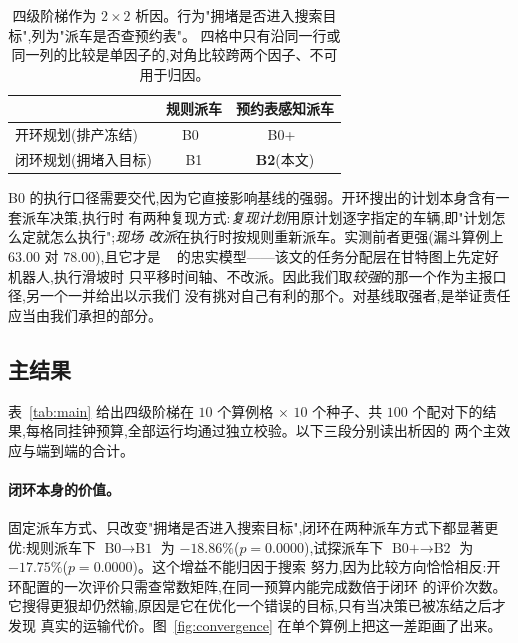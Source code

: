 \documentclass[manuscript,screen,review]{acmart}
\newcommand{\NCases}{10}
\newcommand{\NSeeds}{10}
\newcommand{\NPairs}{100}
\newcommand{\GainLoopRule}{18.86\%}      %
\newcommand{\PLoopRule}{0.0000}
\newcommand{\GainLoopProbe}{17.75\%}     %
\newcommand{\PLoopProbe}{0.0000}
\begin{document}
\begin{table}[t]
\caption{四级阶梯作为 $2\times 2$ 析因。行为"拥堵是否进入搜索目标",列为"派车是否查预约表"。
四格中只有沿同一行或同一列的比较是单因子的,对角比较跨两个因子、不可用于归因。}
\label{tab:arms}
\footnotesize
\begin{tabular}{@{}lcc@{}}
\toprule
 & 规则派车 & 预约表感知派车 \\
\midrule
开环规划(排产冻结) & B0~\cite{li2026framework} & B0+~\cite{sun2023integrated} \\
闭环规划(拥堵入目标) & B1 & \textbf{B2}(本文) \\
\bottomrule
\end{tabular}
\end{table}

B0 的执行口径需要交代,因为它直接影响基线的强弱。开环搜出的计划本身含有一套派车决策,执行时
有两种复现方式:\emph{复现计划}用原计划逐字指定的车辆,即"计划怎么定就怎么执行";\emph{现场
改派}在执行时按规则重新派车。实测前者更强(漏斗算例上 $63.00$ 对 $78.00$),且它才是
~\cite{li2026framework} 的忠实模型——该文的任务分配层在甘特图上先定好机器人,执行滑坡时
只平移时间轴、不改派。因此我们取\emph{较强}的那一个作为主报口径,另一个一并给出以示我们
没有挑对自己有利的那个。对基线取强者,是举证责任应当由我们承担的部分。

\subsection{主结果}
\label{sec:main}

表~\ref{tab:main} 给出四级阶梯在 $\NCases$ 个算例格 $\times$ $\NSeeds$ 个种子、共
$\NPairs$ 个配对下的结果,每格同挂钟预算,全部运行均通过独立校验。以下三段分别读出析因的
两个主效应与端到端的合计。

\begin{table}[t]
\caption{四级阶梯在同挂钟预算下的完工时间,以及 $2\times 2$ 析因的四个单因子配对比较。
负值表示完工时间下降,即更好。$n=\NPairs$ 个按 $(\text{算例},\text{种子})$ 配对的比较,
双侧 Wilcoxon 符号秩检验。}
\label{tab:main}
\small

\end{table}

\paragraph{闭环本身的价值。}
固定派车方式、只改变"拥堵是否进入搜索目标",闭环在两种派车方式下都显著更优:规则派车下
$\text{B0}\to\text{B1}$ 为 $-\GainLoopRule$($p=\PLoopRule$),试探派车下
$\text{B0+}\to\text{B2}$ 为 $-\GainLoopProbe$($p=\PLoopProbe$)。这个增益不能归因于搜索
努力,因为比较方向恰恰相反:开环配置的一次评价只需查常数矩阵,在同一预算内能完成数倍于闭环
的评价次数。它搜得更狠却仍然输,原因是它在优化一个错误的目标,只有当决策已被冻结之后才发现
真实的运输代价。图~\ref{fig:convergence} 在单个算例上把这一差距画了出来。
\end{document}
